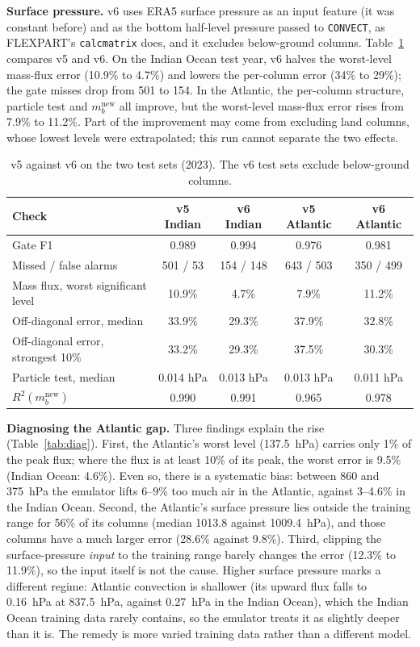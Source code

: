 \documentclass[11pt,a4paper]{article}
\begin{document}
\textbf{Surface pressure.} v6 uses ERA5 surface pressure as an input feature (it was constant before)
and as the bottom half-level pressure passed to \texttt{CONVECT}, as FLEXPART's \texttt{calcmatrix}
does, and it excludes below-ground columns. Table~\ref{tab:v6} compares v5 and v6. On the Indian Ocean
test year, v6 halves the worst-level mass-flux error (10.9\% to 4.7\%) and lowers the per-column error
(34\% to 29\%); the gate misses drop from 501 to 154. In the Atlantic, the per-column structure,
particle test and $m_b^{\text{new}}$ all improve, but the worst-level mass-flux error rises from 7.9\%
to 11.2\%. Part of the improvement may come from excluding land columns, whose lowest levels were
extrapolated; this run cannot separate the two effects.

\begin{table}[h]
\centering\small
\begin{tabular}{lcccc}
\toprule
Check & v5 Indian & v6 Indian & v5 Atlantic & v6 Atlantic \\
\midrule
Gate F1 & 0.989 & 0.994 & 0.976 & 0.981 \\
Missed / false alarms & 501 / 53 & 154 / 148 & 643 / 503 & 350 / 499 \\
Mass flux, worst significant level & 10.9\% & 4.7\% & 7.9\% & 11.2\% \\
Off-diagonal error, median & 33.9\% & 29.3\% & 37.9\% & 32.8\% \\
Off-diagonal error, strongest 10\% & 33.2\% & 29.3\% & 37.5\% & 30.3\% \\
Particle test, median & 0.014 hPa & 0.013 hPa & 0.013 hPa & 0.011 hPa \\
$R^2(m_b^{\text{new}})$ & 0.990 & 0.991 & 0.965 & 0.978 \\
\bottomrule
\end{tabular}
\caption{v5 against v6 on the two test sets (2023). The v6 test sets exclude below-ground columns.}
\label{tab:v6}
\end{table}

\textbf{Diagnosing the Atlantic gap.} Three findings explain the rise (Table~\ref{tab:diag}). First,
the Atlantic's worst level (137.5~hPa) carries only 1\% of the peak flux; where the flux is at least
10\% of its peak, the worst error is 9.5\% (Indian Ocean: 4.6\%). Even so, there is a systematic bias:
between 860 and 375~hPa the emulator lifts 6--9\% too much air in the Atlantic, against 3--4.6\% in
the Indian Ocean. Second, the Atlantic's surface pressure lies outside the training range for 56\% of
its columns (median 1013.8 against 1009.4~hPa), and those columns have a much larger error (28.6\%
against 9.8\%). Third, clipping the surface-pressure \emph{input} to the training range barely changes
the error (12.3\% to 11.9\%), so the input itself is not the cause. Higher surface pressure marks a
different regime: Atlantic convection is shallower (its upward flux falls to 0.16~hPa at 837.5~hPa,
against 0.27~hPa in the Indian Ocean), which the Indian Ocean training data rarely contains, so the
emulator treats it as slightly deeper than it is. The remedy is more varied training data rather than
a different model.
\end{document}
